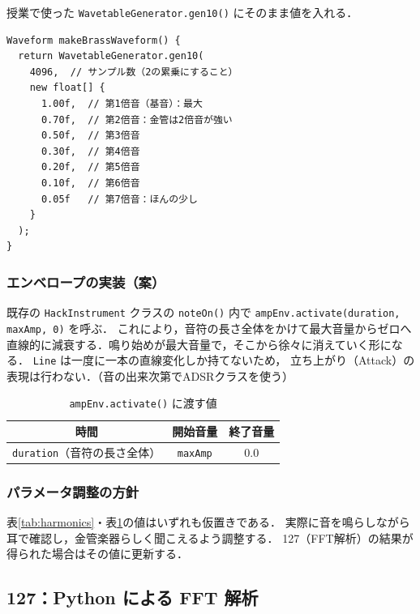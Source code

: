 \documentclass[a4paper,12pt]{jsarticle}
\begin{document}
授業で使った \texttt{WavetableGenerator.gen10()} にそのまま値を入れる．

\begin{lstlisting}[style=processing, caption={金管楽器風の波形生成（案）}]
Waveform makeBrassWaveform() {
  return WavetableGenerator.gen10(
    4096,  // サンプル数（2の累乗にすること）
    new float[] {
      1.00f,  // 第1倍音（基音）：最大
      0.70f,  // 第2倍音：金管は2倍音が強い
      0.50f,  // 第3倍音
      0.30f,  // 第4倍音
      0.20f,  // 第5倍音
      0.10f,  // 第6倍音
      0.05f   // 第7倍音：ほんの少し
    }
  );
}
\end{lstlisting}

\subsubsection{エンベロープの実装（案）}

既存の \texttt{HackInstrument} クラスの \texttt{noteOn()} 内で
\texttt{ampEnv.activate(duration, maxAmp, 0)} を呼ぶ．
これにより，音符の長さ全体をかけて最大音量からゼロへ直線的に減衰する．鳴り始めが最大音量で，そこから徐々に消えていく形になる．
\texttt{Line} は一度に一本の直線変化しか持てないため，
立ち上がり（Attack）の表現は行わない．（音の出来次第でADSRクラスを使う）


\begin{table}[h]
  \centering
  \caption{\texttt{ampEnv.activate()} に渡す値}
  \label{tab:line-params}
  \begin{tabular}{ccc}
    \toprule
    時間 & 開始音量 & 終了音量 \\
    \midrule
    \texttt{duration}（音符の長さ全体） & \texttt{maxAmp} & 0.0 \\
    \bottomrule
  \end{tabular}
\end{table}


\subsubsection{パラメータ調整の方針}

表\ref{tab:harmonics}・表\ref{tab:line-params}の値はいずれも仮置きである．
実際に音を鳴らしながら耳で確認し，金管楽器らしく聞こえるよう調整する．
127（FFT解析）の結果が得られた場合はその値に更新する．

\subsection{127：Python による FFT 解析}
\label{sec:detail-127}
\end{document}
